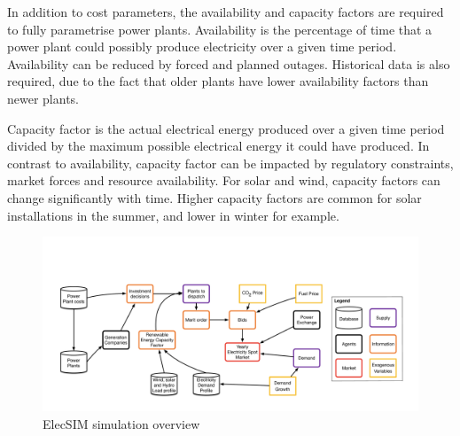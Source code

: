 In addition to cost parameters, the availability and capacity factors are required to fully parametrise power plants. Availability is the percentage of time that a power plant could possibly produce electricity over a given time period. Availability can be reduced by forced and planned outages. Historical data is also required, due to the fact that older plants have lower availability factors than newer plants.

Capacity factor is the actual electrical energy produced over a given time period divided by the maximum possible electrical energy it could have produced. In contrast to availability, capacity factor can be impacted by regulatory constraints, market forces and resource availability. For solar and wind, capacity factors can change significantly with time. Higher capacity factors are common for solar installations in the summer, and lower in winter for example. 









\begin{figure}
	\centering
	\includegraphics[width=0.97\linewidth]{figures/low_level_system}
	\caption{ElecSIM simulation overview}
	\label{fig:lowlevelsystem}
\end{figure}


